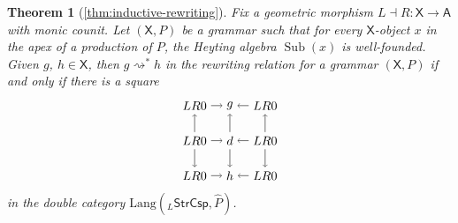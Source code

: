 \documentclass{amsart}
\renewcommand{\hat}[1]{\widehat{#1}}
\newcommand{\A}{\cat{A}}
\newcommand{\X}{\cat{X}}
\newcommand{\StrCsp}{\cat{StrCsp}}
\newcommand{\Lang}{\mathrm{Lang}}
\newcommand{\cat}[1]{\mathsf{#1}}
\newcommand{\from}{\colon}
\newcommand{\deriv}[2]{#1 \rightsquigarrow^\ast #2}
\DeclareMathOperator{\Sub}{Sub}
\newtheorem*{theorem*}{Theorem}
\theoremstyle{remark}
\theoremstyle{definition}
\begin{document}
\begin{theorem*}[\ref{thm:inductive-rewriting}]
  Fix a geometric morphism $ L \dashv R \from \X \to \A $
  with monic counit. Let $ ( \X , P ) $ be a grammar such
  that for every $ \X $-object $ x $ in the apex of a
  production of $ P $, the Heyting algebra $ \Sub (x) $ is
  well-founded. Given $ g $, $ h \in \X $, then
  $ \deriv{g}{h} $ in the rewriting relation for a grammar
  $ ( \X , P ) $ if and only if there is a square
  \[
    \begin{tikzpicture}
      \node (1t) at (0,2) {$ LR 0 $};
      \node (2t) at (1,2) {$ g $};
      \node (3t) at (2,2) {$ LR 0 $};
      \node (1m) at (0,1) {$ LR 0 $};
      \node (2m) at (1,1) {$ d $};
      \node (3m) at (2,1) {$ LR 0 $};
      \node (1b) at (0,0) {$ LR 0 $};
      \node (2b) at (1,0) {$ h $};
      \node (3b) at (2,0) {$ LR 0 $};
      \draw [->] (1t) to node [] {\scriptsize{$  $}} (2t);
      \draw [->] (3t) to node [] {\scriptsize{$  $}} (2t);
      \draw [->] (1m) to node [] {\scriptsize{$  $}} (2m);
      \draw [->] (3m) to node [] {\scriptsize{$  $}} (2m);
      \draw [->] (1b) to node [] {\scriptsize{$  $}} (2b);
      \draw [->] (3b) to node [] {\scriptsize{$  $}} (2b);
      \draw [->] (1m) to node [] {\scriptsize{$  $}} (1t);
      \draw [->] (1m) to node [] {\scriptsize{$  $}} (1b);
      \draw [->] (2m) to node [] {\scriptsize{$  $}} (2t);
      \draw [->] (2m) to node [] {\scriptsize{$  $}} (2b);
      \draw [->] (3m) to node [] {\scriptsize{$  $}} (3t);
      \draw [->] (3m) to node [] {\scriptsize{$  $}} (3b);
    \end{tikzpicture}
  \]
  in the double category $ \Lang ( _{L}\StrCsp , \hat{P} ) $.
\end{theorem*}
\end{document}
